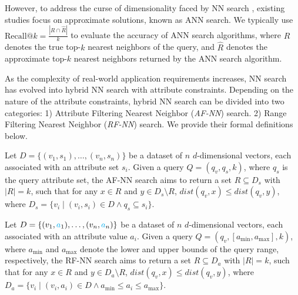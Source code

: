 \documentclass[sigconf, nonacm]{acmart}
\begin{document}
{	However, to address the curse of dimensionality faced by NN search \cite{dimcurse}, existing studies focus on approximate solutions, known as ANN  search. We typically use $\text{Recall}@k = \frac{|R \cap \hat{R}|}{k}$ to evaluate the accuracy of ANN search algorithms, where $R$ denotes the true top-$k$ nearest neighbors of the query, and $\hat{R}$ denotes the approximate top-$k$ nearest neighbors returned by the ANN search algorithm.
	
	As the complexity of real-world application requirements increases, NN search has evolved into hybrid NN search with attribute constraints. Depending on the nature of the attribute constraints, hybrid NN search can be divided into two categories: 1) Attribute Filtering Nearest Neighbor (\textit{AF-NN}) search. 2) Range Filtering Nearest Neighbor (\textit{RF-NN}) search. We provide their formal definitions below.
	
	\begin{definition}[AF-NN Search]
		Let \( D = \{(v_1, s_1), \ldots, (v_n, s_n)\} \) be a dataset of \( n \) \( d \)-dimensional vectors, each associated with an attribute set \( s_i \). Given a query \( Q = (q_v, q_s, k) \), where \( q_s \) is the query attribute set, the AF-NN search aims to return a set \( R \subseteq D_s \) with \( |R| = k \), such that for any \( x \in R \) and \( y \in D_s \setminus R \), \( \textit{dist}(q_v, x) \leq \textit{dist}(q_v, y) \), where \( D_s = \{ v_i \mid (v_i, s_i) \in D \land q_s \subseteq s_i \} \).
	\end{definition}
	
	
	\begin{definition}[RF-NN Search]
		
		Let \( D = \{(v_1, \textcolor{cyan}{a}_1), \ldots, (v_n, \textcolor{cyan}{a}_n)\} \) be a dataset of \( n \) \( d \)-dimensional vectors, each associated with an attribute value \( a_i \). Given a query \( Q = (q_v, [a_{\min}, a_{\max}], k) \), where \( a_{\min} \) and \( a_{\max} \) denote the lower and upper bounds of the query range, respectively, the RF-NN search aims to return a set \( R \subseteq D_a \) with \( |R| = k \), such that for any \( x \in R \) and \( y \in D_a \setminus R \), \( \textit{dist}(q_v, x) \leq \textit{dist}(q_v, y) \), where \( D_a = \{ v_i \mid (v_i, a_i) \in D \land a_{\min} \leq a_i \leq a_{\max} \} \).
	\end{definition}
	
}
\end{document}
